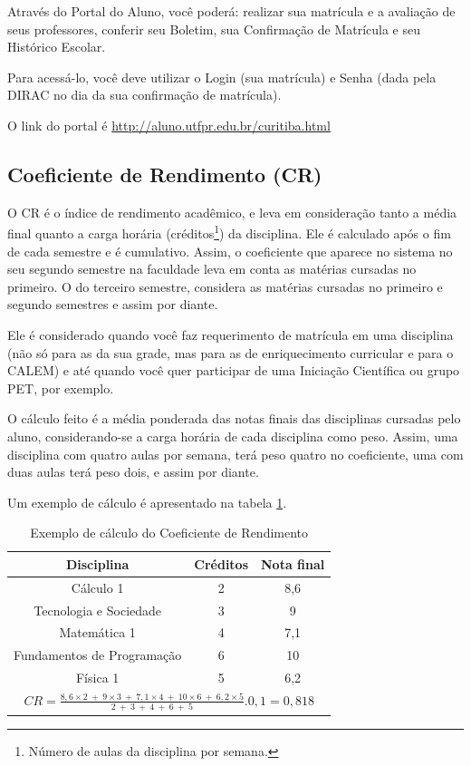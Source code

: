 \documentclass[a4paper,12pt,openany]{article}
\begin{document}
Através do Portal do Aluno, você poderá: realizar sua matrícula e a avaliação de seus professores, conferir seu Boletim, sua Confirmação de Matrícula e seu Histórico Escolar.

Para acessá-lo, você deve utilizar o Login (sua matrícula) e Senha (dada pela DIRAC no dia da sua confirmação de matrícula). 

O link do portal é \url{http://aluno.utfpr.edu.br/curitiba.html}



\subsection{Coeficiente de Rendimento (CR)}

O CR é o índice de rendimento acadêmico, e leva em consideração tanto a média final quanto a carga horária (créditos\footnote{Número de aulas da disciplina por semana.}) da disciplina. Ele é calculado após o fim de cada semestre e é cumulativo. Assim, o coeficiente que aparece no sistema no seu segundo semestre na faculdade leva em conta as matérias cursadas no primeiro. O do terceiro semestre, considera as matérias cursadas no primeiro e segundo semestres e assim por diante.

Ele é considerado quando você faz requerimento de matrícula em uma disciplina (não só para as da sua grade, mas para as de enriquecimento curricular e para o CALEM) e até quando você quer participar de uma Iniciação Científica ou grupo PET, por exemplo.

O cálculo feito é a média ponderada das notas finais das disciplinas cursadas pelo aluno, considerando-se a carga horária de cada disciplina como peso. Assim, uma disciplina com quatro aulas por semana, terá peso quatro no coeficiente, uma com duas aulas terá peso dois, e assim por diante.

Um exemplo de cálculo é apresentado na tabela \ref{tbl01}.

\begin{table}[h!] \centering
    \begin{spacing}{1.5}
    \begin{tabular}{|c|c|c|} \hline
        Disciplina & Créditos & Nota final \\ \hline
        Cálculo 1 & 2 & 8,6 \\ \hline
        Tecnologia e Sociedade & 3 & 9 \\ \hline
        Matemática 1 & 4 & 7,1 \\ \hline
        Fundamentos de Programação & 6 & 10 \\ \hline
        Física 1 & 5 & 6,2 \\ \hline
        \multicolumn{3}{|c|}{$CR = \frac{8,6 \times 2\ +\ 9 \times 3\ +\ 7,1 \times 4\ +\ 10 \times 6\ +\ 6,2 \times 5}{2\ +\ 3\ +\ 4\ +\ 6\ +\ 5} . 0,1 = 0,818 $ } \\ \hline
    \end{tabular}
    \end{spacing}
    \caption{Exemplo de cálculo do Coeficiente de Rendimento}
    \label{tbl01}

\end{table}
\end{document}
